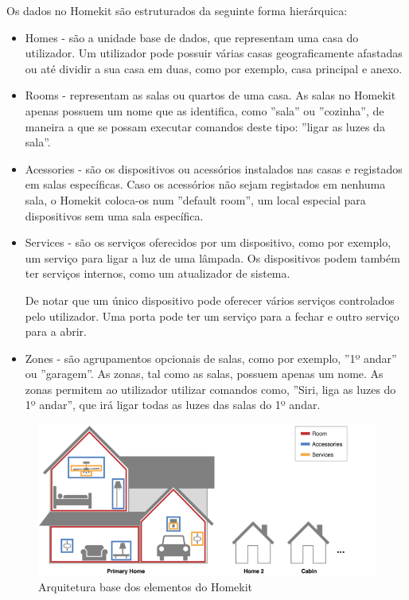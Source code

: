 Os dados no Homekit são estruturados da seguinte forma hierárquica:
\begin{itemize}
    \item Homes - são a unidade base de dados, que representam uma casa do utilizador. Um utilizador pode possuir várias casas geograficamente afastadas ou até dividir a sua casa em duas, como por exemplo, casa principal e anexo.

    \item Rooms - representam as salas ou quartos de uma casa. As salas no Homekit apenas possuem um nome que as identifica, como ''sala'' ou ''cozinha'', de maneira a que se possam executar comandos deste tipo: ''ligar as luzes da sala''.

    \item Acessories - são os dispositivos ou acessórios instalados nas casas e registados em salas específicas. Caso os acessórios não sejam registados em nenhuma sala, o Homekit coloca-os num ''default room'', um local especial para dispositivos sem uma sala específica.

    \item Services - são os serviços oferecidos por um dispositivo, como por exemplo, um serviço para ligar a luz de uma lâmpada. Os dispositivos podem também ter serviços internos, como um atualizador de sistema.

    De notar que um único dispositivo pode oferecer vários serviços controlados pelo utilizador. Uma porta pode ter um serviço para a fechar e outro serviço para a abrir.

    \item Zones - são agrupamentos opcionais de salas, como por exemplo, ''1º andar'' ou ''garagem''. As zonas, tal como as salas, possuem apenas um nome. As zonas permitem ao utilizador utilizar comandos como, ''Siri, liga as luzes do 1º andar'', que irá ligar todas as luzes das salas do 1º andar.
\end{itemize}

\begin{figure}[H]
  \centering
        \includegraphics[scale=0.56]{img/homekit-layout.png}
  \caption{Arquitetura base dos elementos do Homekit}
\end{figure}

